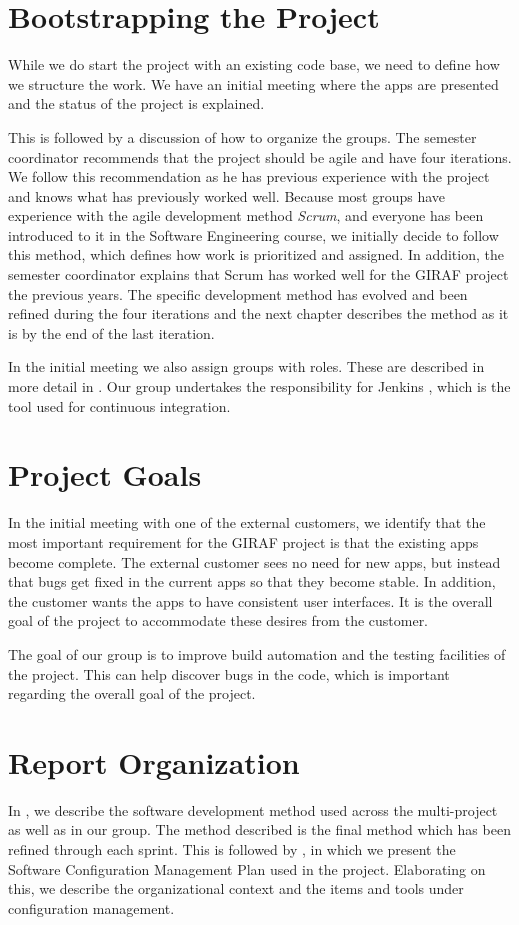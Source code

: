 \section{Bootstrapping the Project}
While we do start the project with an existing code base, we need to define how we structure the work. We have an initial meeting where the apps are presented and the status of the project is explained.

This is followed by a discussion of how to organize the groups. The semester coordinator recommends that the project should be agile and have four iterations. We follow this recommendation as he has previous experience with the project and knows what has previously worked well. Because most groups have experience with the agile development method \emph{Scrum}, and everyone has been introduced to it in the Software Engineering course, we initially decide to follow this method, which defines how work is prioritized and assigned. In addition, the semester coordinator explains that Scrum has worked well for the GIRAF project the previous years. The specific development method has evolved and been refined during the four iterations and the next chapter describes the method as it is by the end of the last iteration.

In the initial meeting we also assign groups with roles. These are described in more detail in . Our group undertakes the responsibility for Jenkins \cite{JenkinsWebsite}, which is the tool used for continuous integration.

\section{Project Goals}
In the initial meeting with one of the external customers, we identify that the most important requirement for the GIRAF project is that the existing apps become complete. The external customer sees no need for new apps, but instead that bugs get fixed in the current apps so that they become stable. In addition, the customer wants the apps to have consistent user interfaces. It is the overall goal of the project to accommodate these desires from the customer.

The goal of our group is to improve build automation and the testing facilities of the project. This can help discover bugs in the code, which is important regarding the overall goal of the project.

\section{Report Organization}
In , we describe the software development method used across the multi-project as well as in our group. The method described is the final method which has been refined through each sprint. This is followed by , in which we present the Software Configuration Management Plan used in the project. Elaborating on this, we describe the organizational context and the items and tools under configuration management.

